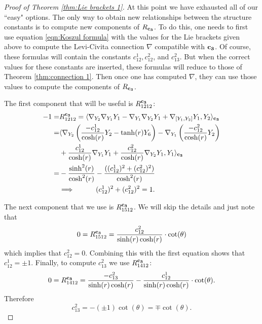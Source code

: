\documentclass[10pt]{amsart}
\def\la{\langle}
\def\ra{\rangle}
\def\th{\theta}
\theoremstyle{definition}
\theoremstyle{remark}
\numberwithin{equation}{section}
\begin{document}
\begin{proof}[Proof of Theorem \ref{thm:Lie brackets 1}]
At this point we have exhausted all of our ``easy" options.  
The only way to obtain new relationships between the structure constants is to compute new components of $R_{\bf c_3}$.  
To do this, one needs to first use equation \eqref{eqn:Koszul formula} with the values for the Lie brackets given above to compute the Levi-Civita connection $\nabla$ compatible with ${\bf c_3}$.  
Of course, these formulas will contain the constants $c_{12}^1, c_{12}^2$, and $c_{13}^2$.  
But when the correct values for these constants are inserted, these formulas will reduce to those of Theorem \ref{thm:connection 1}.
Then once one has computed $\nabla$, they can use those values to compute the components of $R_{\bf c_3}$.  

The first component that will be useful is $R^{\bf c_3}_{1212}$:
	\begin{align*}
	-1 = &R^{\bf c_3}_{1212} = \la \nabla_{Y_2} \nabla_{Y_1} Y_1 - \nabla_{Y_1} \nabla_{Y_2} Y_1 + \nabla_{[Y_1,Y_2]} Y_1,Y_2 \ra_{\bf c_3}  \\
	= &\la \nabla_{Y_2} \left( \frac{- c_{12}^1}{\cosh(r)} Y_2 - \tanh(r) Y_6 \right) - \nabla_{Y_1} \left( \frac{-c_{12}^2}{\cosh(r)} Y_2 \right) \\
	&+ \frac{c_{12}^1}{\cosh(r)} \nabla_{Y_1}Y_1 + \frac{c_{12}^2}{\cosh(r)} \nabla_{Y_2}Y_1, Y_1 \ra_{\bf c_3}  \\
	= &- \frac{\sinh^2(r)}{\cosh^2(r)} - \frac{((c_{12}^1)^2 + (c_{12}^2)^2)}{\cosh^2(r)}  \\
	&\Longrightarrow \hskip 30pt  (c_{12}^1)^2 + (c_{12}^2)^2 = 1.
	\end{align*}
	
The next component that we use is $R^{\bf c_3}_{1512}$.  
We will skip the details and just note that
	\begin{equation*}
	0 = R^{\bf c_3}_{1512} = \frac{c_{12}^2}{\sinh(r) \cosh(r)} \cdot \cot(\th)
	\end{equation*}
which implies that $c_{12}^2 = 0$.  
Combining this with the first equation shows that $c_{12}^1 = \pm 1$.  
Finally, to compute $c_{13}^2$ we use $R^{\bf c_3}_{1412}$:
	\begin{equation*}
	0 = R^{\bf c_3}_{1412} = \frac{- c_{13}^2}{\sinh(r) \cosh(r)} - \frac{c_{12}^1}{\sinh(r) \cosh(r)} \cdot \cot(\th).
	\end{equation*}
Therefore
	\begin{equation*}
	c_{13}^2 = - (\pm 1) \cot(\th) = \mp \cot(\th).
	\end{equation*}




\end{proof}
\end{document}
